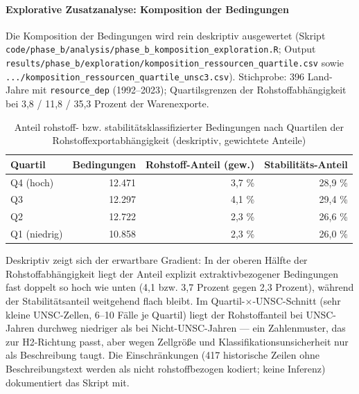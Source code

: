 
\paragraph{Explorative Zusatzanalyse: Komposition der Bedingungen}
Die Komposition der Bedingungen wird rein deskriptiv ausgewertet (Skript
\texttt{code/phase\_b/analysis/phase\_b\_komposition\_exploration.R}; Output
\texttt{results/phase\_b/exploration/komposition\_ressourcen\_quartile.csv}
sowie \texttt{.../komposition\_ressourcen\_quartile\_unsc3.csv}). Stichprobe:
396 Land-Jahre mit \texttt{resource\_dep} (1992--2023); Quartilsgrenzen der
Rohstoffabhängigkeit bei 3{,}8 / 11{,}8 / 35{,}3 Prozent der Warenexporte.

\begin{table}[h]
\centering
\begin{tabular}{lrrr}
\hline
Quartil & Bedingungen & Rohstoff-Anteil (gew.) & Stabilitäts-Anteil \\
\hline
Q4 (hoch) & 12.471 & 3{,}7 \% & 28{,}9 \% \\
Q3 & 12.297 & 4{,}1 \% & 29{,}4 \% \\
Q2 & 12.722 & 2{,}3 \% & 26{,}6 \% \\
Q1 (niedrig) & 10.858 & 2{,}3 \% & 26{,}0 \% \\
\hline
\end{tabular}
\caption{Anteil rohstoff- bzw. stabilitätsklassifizierter Bedingungen nach Quartilen der Rohstoffexportabhängigkeit (deskriptiv, gewichtete Anteile)}
\end{table}

Deskriptiv zeigt sich der erwartbare Gradient: In der oberen Hälfte der
Rohstoffabhängigkeit liegt der Anteil explizit extraktivbezogener Bedingungen
fast doppelt so hoch wie unten (4{,}1 bzw. 3{,}7 Prozent gegen 2{,}3 Prozent),
während der Stabilitätsanteil weitgehend flach bleibt. Im Quartil-$\times$-UNSC-Schnitt
(sehr kleine UNSC-Zellen, 6--10 Fälle je Quartil) liegt der Rohstoffanteil bei
UNSC-Jahren durchweg niedriger als bei Nicht-UNSC-Jahren — ein Zahlenmuster,
das zur H2-Richtung passt, aber wegen Zellgröße und Klassifikationsunsicherheit
nur als Beschreibung taugt. Die Einschränkungen (417 historische Zeilen ohne
Beschreibungstext werden als nicht rohstoffbezogen kodiert; keine Inferenz)
dokumentiert das Skript mit.

